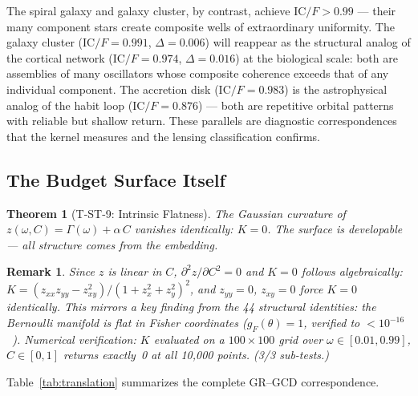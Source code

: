 \documentclass[
  aps,
  prd,
  twocolumn,
  superscriptaddress,
  nofootinbib,
  floatfix
]{revtex4-2}
\newtheorem{theorem}{Theorem}
\newtheorem{remark}{Remark}
\newcommand{\Gam}{\Gamma}
\newcommand{\IC}{\mathrm{IC}}
\begin{document}
The spiral galaxy and galaxy cluster, by contrast, achieve
$\IC/F > 0.99$ --- their many component stars create composite
wells of extraordinary uniformity.  The galaxy cluster
($\IC/F = 0.991$, $\Delta = 0.006$) will reappear as the
structural analog of the cortical network ($\IC/F = 0.974$,
$\Delta = 0.016$) at the biological scale: both are
assemblies of many oscillators whose composite coherence
exceeds that of any individual component.  The accretion disk
($\IC/F = 0.983$) is the astrophysical analog of the habit
loop ($\IC/F = 0.876$) --- both are repetitive orbital
patterns with reliable but shallow return.  These parallels
are diagnostic correspondences that the
kernel measures and the lensing classification confirms.


\subsection{The Budget Surface Itself}

\begin{theorem}[T-ST-9: Intrinsic Flatness]\label{thm:T9}
The Gaussian curvature of $z(\omega, C) = \Gam(\omega) +
\alpha\,C$ vanishes identically: $K = 0$.  The surface is
developable --- all structure comes from the embedding.
\end{theorem}

\begin{remark}
Since $z$ is linear in $C$, $\partial^2 z/\partial C^2 = 0$
and $K = 0$ follows algebraically: $K = (z_{xx}z_{yy} -
z_{xy}^2)/(1 + z_x^2 + z_y^2)^2$, and $z_{yy} = 0$,
$z_{xy} = 0$ force $K = 0$ identically.  This mirrors a key
finding from the 44 structural identities: the Bernoulli
manifold is flat in Fisher coordinates ($g_F(\theta) = 1$,
verified to $< 10^{-16}$~\cite{paulus2025umcp}).  Numerical
verification: $K$ evaluated on a $100 \times 100$ grid over
$\omega \in [0.01, 0.99]$, $C \in [0, 1]$ returns exactly~0
at all 10,000 points.  (3/3 sub-tests.)
\end{remark}

Table~\ref{tab:translation} summarizes the complete GR--GCD
correspondence.
\end{document}
